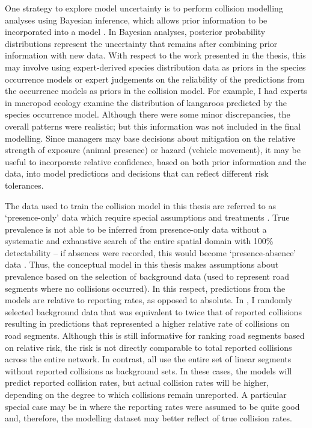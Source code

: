 One strategy to explore model uncertainty is to perform collision modelling analyses using Bayesian inference, which allows prior information to be incorporated into a model \citep{mcca07}. In Bayesian analyses, posterior probability distributions represent the uncertainty that remains after combining prior information with new data. With respect to the work presented in the thesis, this may involve using expert-derived species distribution data as priors in the species occurrence models \citep[see ][]{murr09} or expert judgements on the reliability of the predictions from the occurrence models as priors in the collision model. For example, I had experts in macropod ecology examine the distribution of kangaroos predicted by the species occurrence model. Although there were some minor discrepancies, the overall patterns were realistic; but this information was not included in the final modelling. Since managers may base decisions about mitigation on the relative strength of exposure (animal presence) or hazard (vehicle movement), it may be useful to incorporate relative confidence, based on both prior information and the data, into model predictions and decisions that can reflect different risk tolerances.

The data used to train the collision model in this thesis are referred to as `presence-only' data which require special assumptions and treatments \citep{wart13}. True prevalence is not able to be inferred from presence-only data without a systematic and exhaustive search of the entire spatial domain with 100\% detectability -- if absences were recorded, this would become `presence-absence' data \citep[see][]{hast13}. Thus, the conceptual model in this thesis makes assumptions about prevalence based on the selection of background data (used to represent road segments where no collisions occurred). In this respect, predictions from the models are relative to reporting rates, as opposed to absolute.  In , I randomly selected background data that was equivalent to twice that of reported collisions resulting in predictions that represented a higher relative rate of collisions on road segments. Although this is still informative for ranking road segments based on relative risk, the risk is not directly comparable to total reported collisions across the entire network. In contrast,  all use the entire set of linear segments without reported collisions as background sets. In these cases, the models will predict reported collision rates, but actual collision rates will be higher, depending on the degree to which collisions remain unreported. A particular special case may be in  where the reporting rates were assumed to be quite good and, therefore, the modelling dataset may better reflect of true collision rates.

